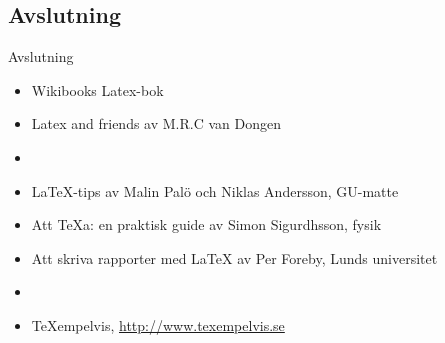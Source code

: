 \documentclass[xcolor=x11names,compress,swedish]{beamer}
\begin{document}
	\subsection{Avslutning}
		\begin{frame}{Avslutning}
			\begin{itemize}
				\item Wikibooks Latex-bok\\
				\item Latex and friends av M.R.C van Dongen
				\item[]
				\item LaTeX-tips av Malin Palö och Niklas Andersson, GU-matte\\
				\item Att TeXa: en praktisk guide av Simon Sigurdhsson, fysik\\
				\item Att skriva rapporter med LaTeX av Per Foreby, Lunds universitet\\
				\item[]
				\item TeXempelvis, \url{http://www.texempelvis.se}
			\end{itemize}
		\end{frame}
\end{document}
